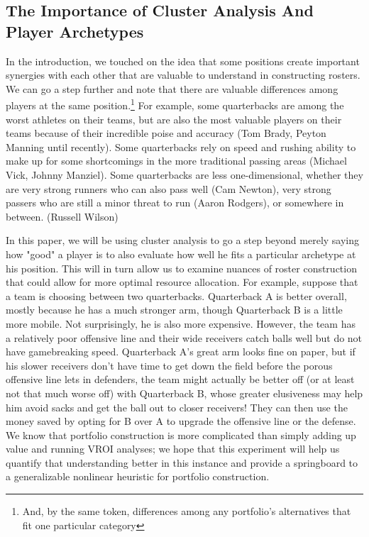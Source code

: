 \documentclass[11pt]{article}
\begin{document}
\subsection{The Importance of Cluster Analysis And Player Archetypes}
In the introduction, we touched on the idea that some positions create important synergies with each other that are valuable to understand in constructing rosters. We can go a step further and note that there are valuable differences among players at the same position.\footnote{And, by the same token, differences among any portfolio's alternatives that fit one particular category} For example, some quarterbacks are among the worst athletes on their teams, but are also the most valuable players on their teams because of their incredible poise and accuracy (Tom Brady, Peyton Manning until recently). Some quarterbacks rely on speed and rushing ability to make up for some shortcomings in the more traditional passing areas (Michael Vick, Johnny Manziel). Some quarterbacks are less one-dimensional, whether they are very strong runners who can also pass well (Cam Newton), very strong passers who are still a minor threat to run (Aaron Rodgers), or somewhere in between. (Russell Wilson) 


In this paper, we will be using cluster analysis to go a step beyond merely saying how "good" a player is to also evaluate how well he fits a particular archetype at his position. This will in turn allow us to examine nuances of roster construction that could allow for more optimal resource allocation. For example, suppose that a team is choosing between two quarterbacks. Quarterback A is better overall, mostly because he has a much stronger arm, though Quarterback B is a little more mobile. Not surprisingly, he is also more expensive. However, the team has a relatively poor offensive line and their wide receivers catch balls well but do not have gamebreaking speed. Quarterback A's great arm looks fine on paper, but if his slower receivers don't have time to get down the field before the porous offensive line lets in defenders, the team might actually be better off (or at least not that much worse off) with Quarterback B, whose greater elusiveness may help him avoid sacks and get the ball out to closer receivers! They can then use the money saved by opting for B over A to upgrade the offensive line or the defense. We know that portfolio construction is more complicated than simply adding up value and running VROI analyses; we hope that this experiment will help us quantify that understanding better in this instance and provide a springboard to a generalizable nonlinear heuristic for portfolio construction.
\end{document}
